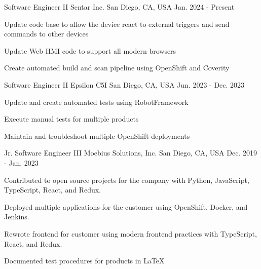 

\begin{cventries}

	\cventry
	{Software Engineer II} %
	{Sentar Inc.} %
	{San Diego, CA, USA} %
	{Jan. 2024 - Present} %
	{
		\begin{cvitems}
			\item {Update code base to allow the device react to external triggers and send commands to other devices}
			\item {Update Web HMI code to support all modern browsers}
			\item {Create automated build and scan pipeline using OpenShift and Coverity}
		\end{cvitems}
	}

	\cventry
	{Software Engineer II} %
	{Epsilon C5I} %
	{San Diego, CA, USA} %
	{Jun. 2023 - Dec. 2023} %
	{
		\begin{cvitems}
			\item {Update and create automated tests using RobotFramework}
			\item {Execute manual tests for multiple products}
			\item {Maintain and troubleshoot multiple OpenShift deployments}
		\end{cvitems}
	}

	\cventry
	{Jr. Software Engineer III} %
	{Moebius Solutions, Inc.} %
	{San Diego, CA, USA} %
	{Dec. 2019 - Jan. 2023} %
	{
		\begin{cvitems} %
			\item {Contributed to open source projects for the company with Python, JavaScript, TypeScript, React, and Redux.}
			\item {Deployed multiple applications for the customer using OpenShift, Docker, and Jenkins.}
			\item {Rewrote frontend for customer using modern frontend practices with TypeScript, React, and Redux.}
			\item {Documented test procedures for products in LaTeX}
		\end{cvitems}
	}


\end{cventries}
